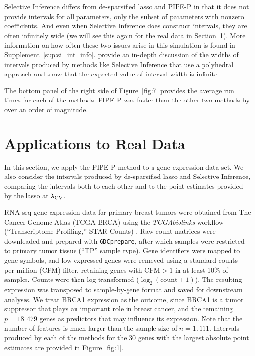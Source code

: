 Selective Inference differs from de-sparsified lasso and PIPE-P in that it does not provide intervals for all parameters, only the subset of parameters with nonzero coefficients. And even when Selective Inference does construct intervals, they are often infinitely wide (we will see this again for the real data in Section~\ref{Sec:RDA}). More information on how often these two issues arise in this simulation is found in Supplement~\ref{sup:si_int_info}. \citet{Kivaranovic2021} provide an in-depth discussion of the widths of intervals produced by methods like Selective Inference that use a polyhedral approach and show that the expected value of interval width is infinite.

The bottom panel of the right side of Figure~\ref{fig:7} provides the average run times for each of the methods. PIPE-P was faster than the other two methods by over an order of magnitude.

\section{Applications to Real Data}
\label{Sec:RDA}

In this section, we apply the PIPE-P method to a gene expression data set. We also consider the intervals produced by de-sparsified lasso and Selective Inference, comparing the intervals both to each other and to the point estimates provided by the lasso at $\lambda_{\textrm{CV}}$.

RNA-seq gene-expression data for primary breast tumors were obtained from The Cancer Genome Atlas (TCGA-BRCA) using the \emph{TCGAbiolinks} workflow (``Transcriptome Profiling,'' STAR-Counts) \citep{tcga_brca_2012,Colaprico2016}. Raw count matrices were downloaded and prepared with \texttt{GDCprepare}, after which samples were restricted to primary tumor tissue (``TP'' sample type). Gene identifiers were mapped to gene symbols, and low expressed genes were removed using a standard counts-per-million (CPM) filter, retaining genes with $\text{CPM} > 1$ in at least 10\% of samples. Counts were then log-transformed ($\log_2(\text{count} + 1)$). The resulting expression was transposed to sample-by-gene format and saved for downstream analyses. We treat BRCA1 expression as the outcome, since BRCA1 is a tumor suppressor that plays an important role in breast cancer, and the remaining $p=18,479$ genes as predictors that may influence its expression. Note that the number of features is much larger than the sample size of $n=1,111$. Intervals produced by each of the methods for the 30 genes with the largest absolute point estimates are provided in Figure~\ref{fig:1}.

